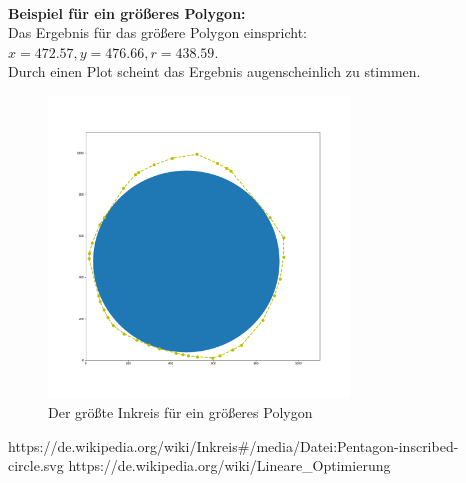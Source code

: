 \documentclass[conference]{IEEEtran}
\begin{document}
	\\
	\textbf{Beispiel für ein größeres Polygon:}\\
	Das Ergebnis für das größere Polygon einspricht:\\
	 $x = 472.57, y = 476.66, r = 438.59$.\\
	Durch einen Plot scheint das Ergebnis augenscheinlich zu stimmen.
	\begin{figure}[h]
		\begin{center}
			\includegraphics[width=8cm]{Inscribed.png}
			\caption{Der größte Inkreis für ein größeres Polygon}
			\label{fail}
		\end{center}
	\end{figure}

	
	\begin{thebibliography}{00}
		https://de.wikipedia.org/wiki/Inkreis\#/media/Datei:Pentagon-inscribed-circle.svg
		https://de.wikipedia.org/wiki/Lineare\_Optimierung
	\end{thebibliography}
	
	
	
\end{document}

